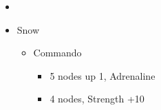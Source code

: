 	\begin{menu}
		\begin{itemize}
			\paradigm
			\begin{itemize}
				\item {}%
				      {\paradigmline[1]{\textit{\com}}{\textit{\rav}}{}}%
				      {\paradigmline{\com}{\med}{}}%
				      {\paradigmline{\sen}{\med}{}}%
				      {\paradigmline{\sen}{\syn}{}}%
				      {\paradigmline{[\rav]}{\rav}{}}%
				      {\paradigmline{[\rav]}{\rav}{}}
			\end{itemize}
			\crystarium
			\begin{itemize}
				\item Snow
				      \begin{itemize}
					      \item Commando
					            \begin{itemize}
						            \item 5 nodes up 1, Adrenaline
						            \item 4 nodes, Strength +10
					            \end{itemize}
				      \end{itemize}
			\end{itemize}
		\end{itemize}
	\end{menu}
	\vfill
	\renewcommand{\first}{[1] Slash \& Burn (\com/\rav)}
	\renewcommand{\second}{[2] War \& Peace (\com/\med)}
	\renewcommand{\fifth}{[5] Dualcasting (\rav/\rav)}
	\renewcommand{\sixth}{[6] Dualcasting (\rav/\rav)}
